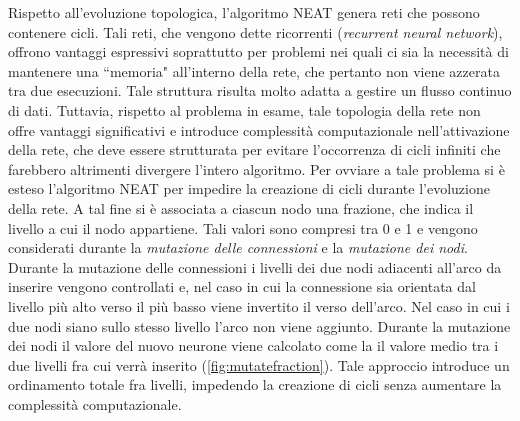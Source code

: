 Rispetto all'evoluzione topologica, l'algoritmo NEAT genera reti che possono
contenere cicli. Tali reti, che vengono dette ricorrenti (\emph{recurrent neural
network}), offrono vantaggi espressivi soprattutto per problemi nei quali ci sia
la necessità di mantenere una ``memoria" all'interno della rete, che pertanto
non viene azzerata tra due esecuzioni. Tale struttura risulta molto adatta a
gestire un flusso continuo di dati. Tuttavia, rispetto al problema in esame,
tale topologia della rete non offre vantaggi significativi e introduce 
complessità
computazionale nell'attivazione della rete, che deve essere strutturata per
evitare l'occorrenza di cicli infiniti che farebbero altrimenti divergere
l'intero algoritmo. Per ovviare a tale problema si è esteso l'algoritmo NEAT per
impedire la creazione di cicli durante l'evoluzione della rete. A tal fine si è
associata a ciascun nodo una frazione, che indica il livello a cui il nodo
appartiene. Tali valori sono compresi tra 0 e 1 e vengono considerati durante
la \emph{mutazione delle connessioni} e la \emph{mutazione dei nodi}. Durante la
mutazione delle connessioni i livelli dei due nodi adiacenti all'arco da inserire
vengono controllati e, nel caso in cui la connessione sia orientata dal livello
più alto verso il più basso viene invertito il verso dell'arco. Nel caso in cui
i due nodi siano sullo stesso livello l'arco non viene aggiunto. Durante la
mutazione dei nodi il valore del nuovo neurone viene calcolato come la il valore
medio tra i due livelli fra cui verrà inserito (\cref{fig:mutatefraction}).
Tale approccio introduce un ordinamento totale fra livelli, impedendo la
creazione di cicli senza aumentare la complessità computazionale.

